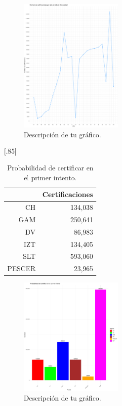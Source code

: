 \documentclass[12pt]{article}
\begin{document}
\begin{figure}[h] %
  \centering
  \includegraphics[width=0.45\textwidth]{graficoCertificacionesUACManual.pdf} %
  \caption{Descripción de tu gráfico.}
  \label{fig:grafico} %
\end{figure}


\newpage

\begin{table}[ht!]
\centering
\scalebox{0.75}[.85]{
\begin{tabular}{rr}
  \hline
 & Certificaciones \\ 
  \hline
CH & 134,038 \\ 
  GAM & 250,641 \\ 
  DV & 86,983 \\ 
  IZT & 134,405 \\ 
  SLT & 593,060 \\ 
  PESCER & 23,965 \\ 
   \hline
\end{tabular}
}
\caption{\label{Prob_Cert_Intento_1}Probabilidad de certificar en el primer intento.}
\end{table}

\begin{figure}[h] %
  \centering
  \includegraphics[width=0.45\textwidth]{graficoCertificacionesPlanteles.pdf} %
  \caption{Descripción de tu gráfico.}
  \label{fig:grafico} %
\end{figure}
\end{document}
